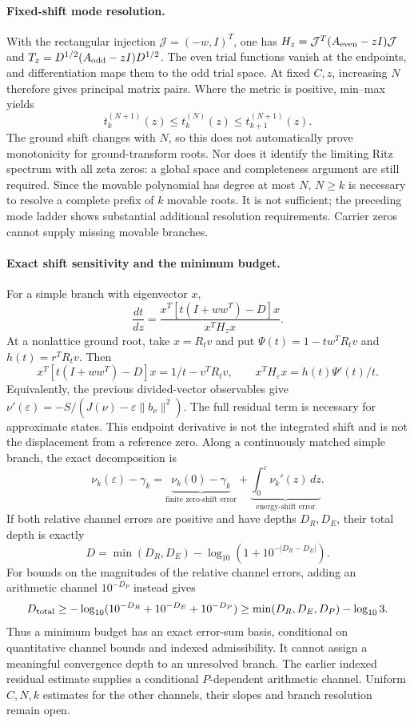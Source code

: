 \paragraph{Fixed-shift mode resolution.}
With the rectangular injection $\mathcal J=(-w,I)^T$, one has
$H_z=\mathcal J^T(A_{\rm even}-zI)\mathcal J$ and
$T_z=D^{1/2}(A_{\rm odd}-zI)D^{1/2}$.
The even trial functions vanish at the endpoints, and differentiation
maps them to the odd trial space. At fixed $C,z$, increasing $N$
therefore gives principal matrix pairs. Where the metric is positive,
min--max yields
\[
 t_k^{(N+1)}(z)\le t_k^{(N)}(z)
                  \le t_{k+1}^{(N+1)}(z).
\]
The ground shift changes with $N$, so this does not automatically
prove monotonicity for ground-transform roots. Nor does it identify
the limiting Ritz spectrum with all zeta zeros: a global space and
completeness argument are still required.
Since the movable polynomial has degree at most $N$, $N\ge k$ is
necessary to resolve a complete prefix of $k$ movable roots. It is
not sufficient; the preceding mode ladder shows substantial additional
resolution requirements. Carrier zeros cannot supply missing movable
branches.

\paragraph{Exact shift sensitivity and the minimum budget.}
For a simple branch with eigenvector $x$,
\[
 \frac{dt}{dz}
 =\frac{x^T[t(I+ww^T)-D]x}{x^TH_zx}.
\]
At a nonlattice ground root, take $x=R_tv$ and put
$\Psi(t)=1-tw^TR_tv$ and $h(t)=r^TR_tv$. Then
\[
 x^T[t(I+ww^T)-D]x=1/t-v^TR_tv,\qquad
 x^TH_\varepsilon x=h(t)\Psi'(t)/t.
\]
Equivalently, the previous divided-vector observables give
$\nu'(\varepsilon)=-S/(J(\nu)-\varepsilon\|b_\nu\|^2)$.
The full residual term is necessary for approximate states. This
endpoint derivative is not the integrated shift and is not the
displacement from a reference zero. Along a continuously matched
simple branch, the exact decomposition is
\[
 \nu_k(\varepsilon)-\gamma_k
 =\underbrace{\nu_k(0)-\gamma_k}_{\text{finite zero-shift error}}
  +\underbrace{\int_0^\varepsilon\nu_k'(z)\,dz}_{\text{energy-shift error}}.
\]
If both relative channel errors are positive and have depths $D_R,D_E$,
their total depth is exactly
\[
 D=\min(D_R,D_E)
       -\log_{10}(1+10^{-|D_R-D_E|}).
\]
For bounds on the magnitudes of the relative channel errors, adding
an arithmetic channel $10^{-D_P}$ instead gives
\[
 D_{\rm total}\ge-\log_{10}
       (10^{-D_R}+10^{-D_E}+10^{-D_P})
 \ge\min(D_R,D_E,D_P)-\log_{10}3.
\]
Thus a minimum budget has an exact error-sum basis, conditional on
quantitative channel bounds and indexed admissibility. It cannot
assign a meaningful convergence depth to an unresolved branch.
The earlier indexed residual estimate supplies a conditional
$P$-dependent arithmetic channel. Uniform $C,N,k$ estimates for
the other channels, their slopes and branch resolution remain open.


